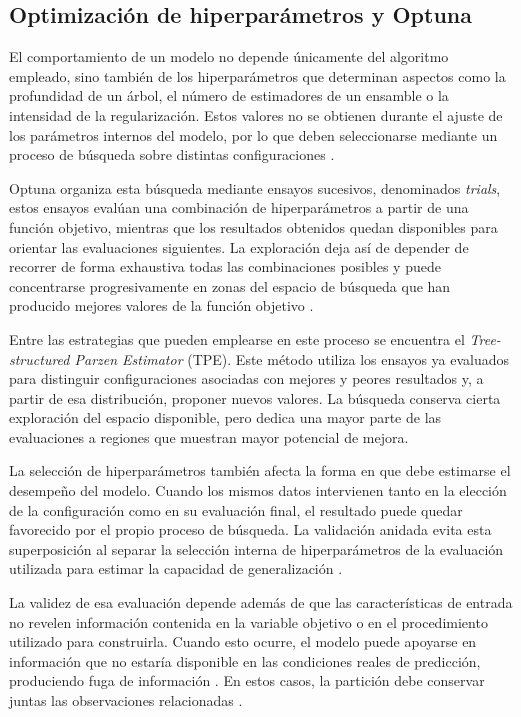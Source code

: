 \subsection{Optimización de hiperparámetros y Optuna}
\label{sec:marco-optuna}

El comportamiento de un modelo no depende únicamente del algoritmo empleado,
sino también de los hiperparámetros que determinan aspectos como la
profundidad de un árbol, el número de estimadores de un ensamble o la
intensidad de la regularización. Estos valores no se obtienen durante el
ajuste de los parámetros internos del modelo, por lo que deben seleccionarse
mediante un proceso de búsqueda sobre distintas configuraciones
\cite{Bergstra2012}.

Optuna organiza esta búsqueda mediante ensayos sucesivos, denominados
\textit{trials}, estos ensayos evalúan una combinación de hiperparámetros a
partir de una función objetivo, mientras que los resultados obtenidos quedan
disponibles para orientar las evaluaciones siguientes. La exploración deja
así de depender de recorrer de forma exhaustiva todas las combinaciones
posibles y puede concentrarse progresivamente en zonas del espacio de búsqueda
que han producido mejores valores de la función objetivo
\cite{Akiba2019}.

Entre las estrategias que pueden emplearse en este proceso se encuentra el
\textit{Tree-structured Parzen Estimator} (TPE). Este método utiliza los
ensayos ya evaluados para distinguir configuraciones asociadas con mejores y
peores resultados y, a partir de esa distribución, proponer nuevos valores.
La búsqueda conserva cierta exploración del espacio disponible, pero dedica
una mayor parte de las evaluaciones a regiones que muestran mayor potencial
de mejora.

La selección de hiperparámetros también afecta la forma en que debe estimarse
el desempeño del modelo. Cuando los mismos datos intervienen tanto en la
elección de la configuración como en su evaluación final, el resultado puede
quedar favorecido por el propio proceso de búsqueda. La validación anidada
evita esta superposición al separar la selección interna de hiperparámetros de
la evaluación utilizada para estimar la capacidad de generalización
\cite{Cawley2010}.

La validez de esa evaluación depende además de que las características de
entrada no revelen información contenida en la variable objetivo o en el
procedimiento utilizado para construirla. Cuando esto ocurre, el modelo puede
apoyarse en información que no estaría disponible en las condiciones reales
de predicción, produciendo fuga de información \cite{Kaufman2012}. En estos casos, la partición debe conservar juntas las
observaciones relacionadas \cite{Roberts2017}.

